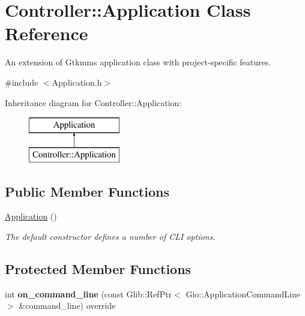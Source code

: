 \hypertarget{classController_1_1Application}{}\section{Controller\+::Application Class Reference}
\label{classController_1_1Application}


An extension of Gtkmm\textquotesingle{}s application class with project-\/specific features.  




{\ttfamily \#include $<$Application.\+h$>$}

Inheritance diagram for Controller\+::Application\+:\begin{figure}[H]
\begin{center}
\leavevmode
\includegraphics[height=2.000000cm]{classController_1_1Application}
\end{center}
\end{figure}
\subsection*{Public Member Functions}
\begin{DoxyCompactItemize}
\item 
\mbox{\hyperlink{classController_1_1Application_ab80e09311c2402c2fa81c70de598f521}{Application}} ()
\begin{DoxyCompactList}\small\item\em The default constructor defines a number of C\+LI options. \end{DoxyCompactList}\end{DoxyCompactItemize}
\subsection*{Protected Member Functions}
\begin{DoxyCompactItemize}
\item 
\mbox{\label{classController_1_1Application_aa249e6a201a8e02879e60d56bd657fc3}} 
int {\bfseries on\+\_\+command\+\_\+line} (const Glib\+::\+Ref\+Ptr$<$ Gio\+::\+Application\+Command\+Line $>$ \&command\+\_\+line) override
\end{DoxyCompactItemize}


